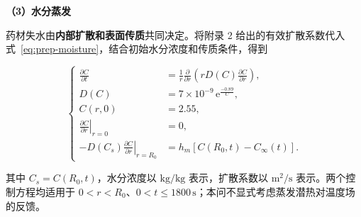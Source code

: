 \noindent\textbf{（3）水分蒸发}

药材失水由\textbf{内部扩散和表面传质}共同决定。将附录 2 给出的有效扩散系数代入式~\eqref{eq:prep-moisture}，结合初始水分浓度和传质条件，得到

\begin{equation}
\left\{
\begin{aligned}
\frac{\partial C}{\partial t}
&=
\frac{1}{r}\frac{\partial}{\partial r}
\left(
rD(C)\frac{\partial C}{\partial r}
\right),
\\[2pt]
D(C)
&=
7\times10^{-9}\,
\mathrm{e}^{\frac{-0.89}{C}},
\\[2pt]
C(r,0)
&=
2.55,
\\[2pt]
\left.\frac{\partial C}{\partial r}\right|_{r=0}
&=
0,
\\[2pt]
-D(C_s)
\left.\frac{\partial C}{\partial r}\right|_{r=R_0}
&=
h_m\!\left[
C(R_0,t)-C_\infty(t)
\right].
\end{aligned}
\right.
\label{eq:q1-moisture-model}
\end{equation}



其中 $C_s=C(R_0,t)$，水分浓度以 $\mathrm{kg/kg}$ 表示，扩散系数以 $\mathrm{m^2/s}$ 表示。两个控制方程均适用于 $0<r<R_0$、$0<t\leq1800\,\mathrm{s}$；本问不显式考虑蒸发潜热对温度场的反馈。




